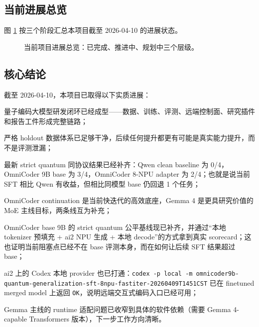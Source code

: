 \documentclass[11pt,a4paper]{article}
\newcommand{\code}[1]{\begingroup\ttfamily\footnotesize\nolinkurl{#1}\endgroup}
\begin{document}
\subsection{当前进展总览}

图 \ref{fig:progress-summary} 按三个阶段汇总本项目截至 2026-04-10 的进展状态。

\begin{figure}[htbp]
\centering
{}
\caption{当前项目进展总览：已完成、推进中、规划中三个层级。}
\label{fig:progress-summary}
\end{figure}

\subsection{核心结论}

截至 2026-04-10，本项目已取得以下实质进展：

  \par 量子编码大模型研发闭环已经成型——数据、训练、评测、远端控制面、研究插件和报告工件形成完整链路；
  \par 严格 holdout 数据体系已足够干净，后续任何提升都更有可能是真实能力提升，而不是评测泄漏；
  \par 最新 strict quantum 同协议结果已经补齐：Qwen clean baseline 为 0/4，OmniCoder 9B base 为 3/4，OmniCoder 8-NPU adapter 为 2/4；也就是说当前 SFT 相比 Qwen 有收益，但相比同模型 base 仍回退 1 个任务；
  \par OmniCoder continuation 是当前快迭代的高效底座，Gemma 4 是更具研究价值的 MoE 主线目标，两条线互为补充；
  \par OmniCoder base 9B 的 strict quantum 公平基线现已补齐，并通过“本地 tokenizer 预填充 + ai2 NPU 生成 + 本地 decode”的方式拿到真实 scorecard；这也证明当前阻塞点已经不在 base 评测本身，而在如何让后续 SFT 结果超过 base；
  \par ai2 上的 Codex 本地 provider 也已打通：\code{codex -p local -m omnicoder9b-quantum-generalization-sft-8npu-fastiter-20260409T1451CST} 已在 finetuned merged model 上返回 \code{OK}，说明远端交互式编码入口已经可用；
  \par Gemma 主线的 runtime 适配问题已收窄到具体的软件依赖（需要 Gemma 4-capable Transformers 版本），下一步工作方向清晰。
\end{document}
